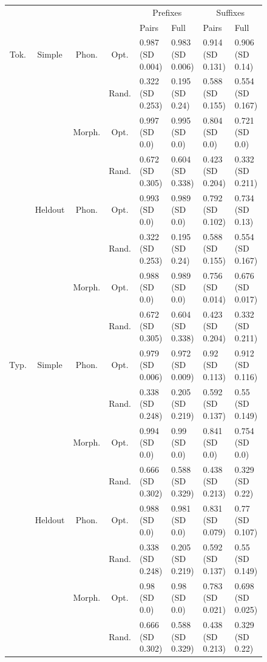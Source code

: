 \documentclass[11pt,letterpaper]{article}
\begin{document}
\begin{figure}
\begin{tabular}{cccc||ll|ll}
	&& &              & \multicolumn{2}{c}{Prefixes}    & \multicolumn{2}{|c}{Suffixes} \\
	  &&   &              & Pairs & Full & Pairs & Full \\ \hline\hline
	Tok. & Simple & Phon.   &   Opt.  &  0.987 (SD 0.004) & 0.983 (SD 0.006) & 0.914 (SD 0.131) & 0.906 (SD 0.14) \\
	& &           &   Rand.  &  0.322 (SD 0.253) & 0.195 (SD 0.24) & 0.588 (SD 0.155) & 0.554 (SD 0.167) \\
	& & Morph.  &   Opt.  &  0.997 (SD 0.0) & 0.995 (SD 0.0) & 0.804 (SD 0.0) & 0.721 (SD 0.0) \\
	& &           &   Rand.  &  0.672 (SD 0.305) & 0.604 (SD 0.338) & 0.423 (SD 0.204) & 0.332 (SD 0.211) \\ \hline
	&	Heldout & Phon.   &   Opt.  &  0.993 (SD 0.0) & 0.989 (SD 0.0) & 0.792 (SD 0.102) & 0.734 (SD 0.13) \\
	 &&  &   Rand.  &  0.322 (SD 0.253) & 0.195 (SD 0.24) & 0.588 (SD 0.155) & 0.554 (SD 0.167) \\
	&&Morph.  &   Opt.  &  0.988 (SD 0.0) & 0.989 (SD 0.0) & 0.756 (SD 0.014) & 0.676 (SD 0.017) \\
	  && &   Rand.  &  0.672 (SD 0.305) & 0.604 (SD 0.338) & 0.423 (SD 0.204) & 0.332 (SD 0.211) \\ \hline\hline
	Typ. & Simple & Phon.   &   Opt.  &  0.979 (SD 0.006) & 0.972 (SD 0.009) & 0.92 (SD 0.113) & 0.912 (SD 0.116) \\
	& &           &   Rand.  &  0.338 (SD 0.248) & 0.205 (SD 0.219) & 0.592 (SD 0.137) & 0.55 (SD 0.149) \\
	& & Morph.  &   Opt.  &  0.994 (SD 0.0) & 0.99 (SD 0.0) & 0.841 (SD 0.0) & 0.754 (SD 0.0) \\
	& &           &   Rand.  &  0.666 (SD 0.302) & 0.588 (SD 0.329) & 0.438 (SD 0.213) & 0.329 (SD 0.22) \\ \hline
	&Heldout&Phon.   &   Opt.  &  0.988 (SD 0.0) & 0.981 (SD 0.0) & 0.831 (SD 0.079) & 0.77 (SD 0.107) \\
	&&           &   Rand.  &  0.338 (SD 0.248) & 0.205 (SD 0.219) & 0.592 (SD 0.137) & 0.55 (SD 0.149) \\
	&&Morph.  &   Opt.  &  0.98 (SD 0.0) & 0.98 (SD 0.0) & 0.783 (SD 0.021) & 0.698 (SD 0.025) \\
	&&           &   Rand.  &  0.666 (SD 0.302) & 0.588 (SD 0.329) & 0.438 (SD 0.213) & 0.329 (SD 0.22) \\

\end{tabular}
\end{figure}
\end{document}
